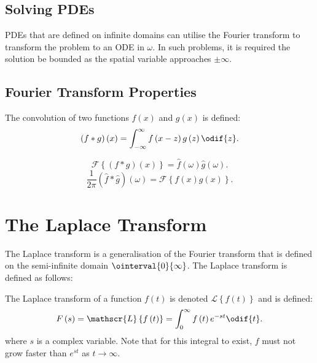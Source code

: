 \documentclass{article}
\begin{document}
\subsection{Solving PDEs}
PDEs that are defined on infinite domains can utilise the Fourier
transform to transform the problem to an ODE in \(\omega\). In such
problems, it is required the solution be bounded as the spatial
variable approaches \(\pm \infty\).
\subsection{Fourier Transform Properties}
\begin{definition}[Convolution]
    The convolution of two functions \(f\left( x \right)\) and \(g\left( x \right)\) is defined:
    \begin{equation*}
        \left( f \ast g \right)\left( x \right) = \int_{-\infty}^\infty f\left( x - z \right) g\left( z \right) \odif{z}.
    \end{equation*}
\end{definition}
\begin{theorem}
    \begin{equation*}
        \mathscr{F}\left\{ \left( f \ast g \right)\left( x \right) \right\} = \hat{f}\left( \omega \right) \hat{g}\left( \omega \right).
    \end{equation*}
    \begin{equation*}
        \frac{1}{2\pi} \left( \hat{f} \ast \hat{g} \right)\left( \omega \right) = \mathscr{F}\left\{ f\left( x \right) g\left( x \right) \right\}.
    \end{equation*}
\end{theorem}
\section{The Laplace Transform}
The Laplace transform is a generalisation of the Fourier transform that
is defined on the semi-infinite domain \(\ointerval{0}{\infty}\). The
Laplace transform is defined as follows:
\begin{definition}
    The Laplace transform of a function \(f\left( t \right)\) is denoted
    \(\mathscr{L}\left\{ f\left( t \right) \right\}\) and is defined:
    \begin{equation*}
        F\left( s \right) = \mathscr{L}\left\{ f\left( t \right) \right\} = \int_0^\infty f\left( t \right) e^{-s t} \odif{t}.
    \end{equation*}
    where \(s\) is a complex variable. Note that for this integral to
    exist, \(f\) must not grow faster than \(e^{st}\) as \(t \to \infty\).
\end{definition}
\end{document}

